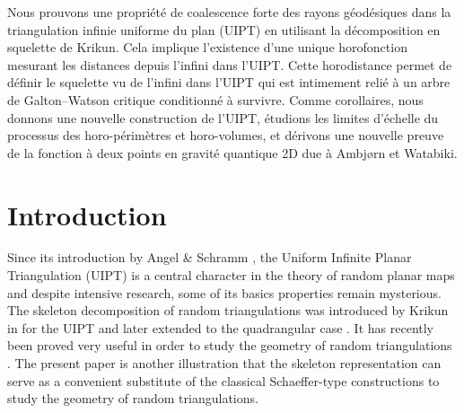 \documentclass[AHL,XML,longabstracts,Unicode,NoSaveZebib]{cedram}
\begin{document}
\begin{altabstract}
Nous prouvons une propri\'et\'e de coalescence forte des rayons g\'eod\'esiques  dans
la triangulation infinie uniforme du plan (UIPT) en utilisant la
d\'ecomposition en squelette de Krikun. Cela implique l'existence d'une unique
horofonction mesurant les distances depuis l'infini dans l'UIPT. Cette
horodistance permet de d\'efinir le squelette vu de l'infini dans l'UIPT qui
est intimement reli\'e \`a un arbre de Galton--Watson critique conditionn\'e \`a
survivre. Comme corollaires, nous donnons une nouvelle construction de
l'UIPT, \'etudions les limites d'\'echelle du processus des horo-p\'erim\`etres et
horo-volumes, et d\'erivons une nouvelle preuve de la fonction \`a deux points en
gravit\'e quantique 2D due \`a Ambj\o rn et Watabiki.
\end{altabstract}

\enlargethispage{12pt}

\maketitle
\section{Introduction}
Since its introduction by Angel \& Schramm \cite{AS}, the Uniform Infinite Planar Triangulation (UIPT) is a central character in the theory of random planar maps and despite intensive research, some of its basics properties remain mysterious. The skeleton decomposition of random triangulations was introduced by Krikun in \cite{Kr} for the UIPT and later extended to the quadrangular case \cite{Kr,LGL17}. It has recently been proved very useful in order to study the geometry of random triangulations  \cite{CLGfpp,AR,LGL17,Budzinski18,M}. The present paper is another illustration that the skeleton representation can serve as a convenient substitute of the classical Schaeffer-type constructions to study the geometry of random triangulations.
\end{document}
